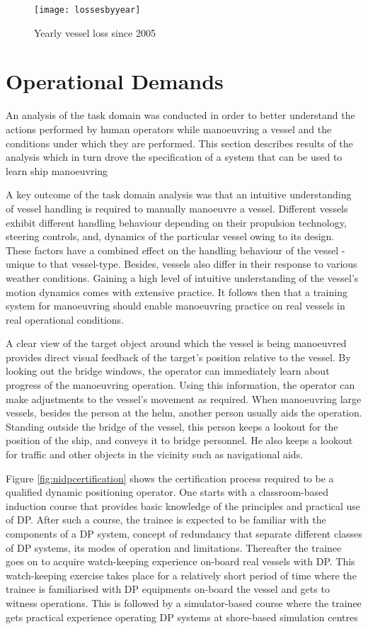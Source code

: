 \begin{figure}
	\centering
	\texttt{[image: lossesbyyear]}
	\caption{Yearly vessel loss since 2005}
	\label{fig:lossesbyyear}
\end{figure}

\section{Operational Demands}
\label{sec:operationaldemands}
An analysis of the task domain was conducted in order to better understand the actions performed by human operators while manoeuvring a vessel and the conditions under which they are performed. This section describes results of the analysis which in turn drove the specification of a system that can be used to learn ship manoeuvring

A key outcome of the task domain analysis was that an intuitive understanding of vessel handling is required to manually manoeuvre a vessel. Different vessels exhibit different handling behaviour depending on their propulsion technology, steering controls, and, dynamics of the particular vessel owing to its design. These factors have a combined effect on the handling behaviour of the vessel - unique to that vessel-type. Besides, vessels also differ in their response to various weather conditions. Gaining a high level of intuitive understanding of the vessel’s motion dynamics comes with extensive practice. It follows then that a training system for manoeuvring should enable manoeuvring practice on real vessels in real operational conditions.

A clear view of the target object around which the vessel is being manoeuvred provides direct visual feedback of the target’s position relative to the vessel. By looking out the bridge windows, the operator can immediately learn about progress of the manoeuvring operation. Using this information, the operator can make adjustments to the vessel's movement as required. When manoeuvring large vessels, besides the person at the helm, another person usually aids the operation. Standing outside the bridge of the vessel, this person keeps a lookout for the position of the ship, and conveys it to bridge personnel. He also keeps a lookout for traffic and other objects in the vicinity such as navigational aids.

Figure \ref{fig:nidpcertification} shows the certification process required to be a qualified dynamic positioning operator. One starts with a classroom-based induction course that provides basic knowledge of the principles and practical use of DP. After such a course, the trainee is expected to be familiar with the components of a DP system, concept of redundancy that separate different classes of DP systems, its modes of operation and limitations. Thereafter the trainee goes on to acquire watch-keeping experience on-board real vessels with DP. This watch-keeping exercise takes place for a relatively short period of time where the trainee is familiarised with DP equipments on-board the vessel and gets to witness operations. This is followed by a simulator-based course where the trainee gets practical experience operating DP systems at shore-based simulation centres 


